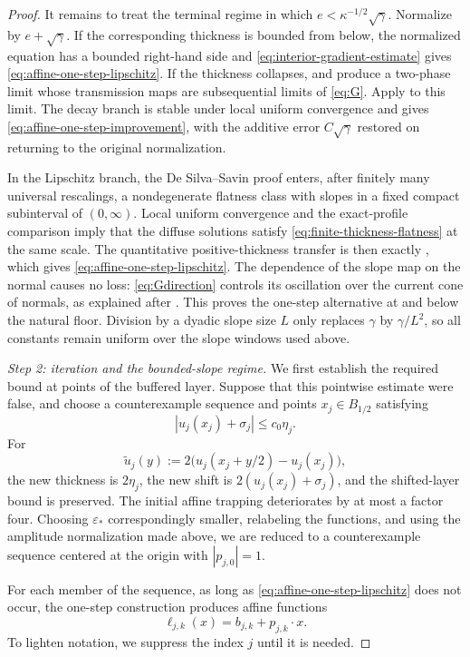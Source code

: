 \documentclass[11pt,letterpaper]{amsart}
\numberwithin{equation}{section}
\theoremstyle{definition}
\theoremstyle{remark}
\begin{document}
\begin{proof}
It remains to treat the terminal regime in which
$e<\kappa^{-1/2}\sqrt\gamma$. Normalize by $e+\sqrt\gamma$. If the
corresponding thickness is bounded from below, the normalized equation has
a bounded right-hand side and
\eqref{eq:interior-gradient-estimate} gives
\eqref{eq:affine-one-step-lipschitz}. If the thickness collapses,
 and  produce a
two-phase limit whose transmission maps are subsequential limits of
\eqref{eq:G}. Apply  to this limit.  The
decay branch is stable under local uniform convergence and gives
\eqref{eq:affine-one-step-improvement}, with the additive error
$C\sqrt\gamma$ restored on returning to the original normalization.

In the Lipschitz branch, the De Silva--Savin proof enters, after finitely
many universal rescalings, a nondegenerate flatness class with slopes in a
fixed compact subinterval of $(0,\infty)$.  Local uniform convergence and
the exact-profile comparison imply that the diffuse solutions satisfy
\eqref{eq:finite-thickness-flatness} at the same scale.  The quantitative
positive-thickness transfer is then exactly
, which gives
\eqref{eq:affine-one-step-lipschitz}.  The dependence of the slope map on
the normal causes no loss: \eqref{eq:Gdirection} controls its oscillation
over the current cone of normals, as explained after
.  This proves the one-step alternative at
and below the natural floor.  Division by a dyadic slope size $L$ only
replaces $\gamma$ by $\gamma/L^2$, so all constants remain uniform over the
slope windows used above.

\medskip
\noindent
\emph{Step 2: iteration and the bounded-slope regime.}
We first establish the required bound at points of the buffered layer.
Suppose that this pointwise estimate were false, and choose a counterexample
sequence and points $x_j\in B_{1/2}$ satisfying
$$
|u_j(x_j)+\sigma_j|\leq c_0\eta_j.
$$
For
$$
\widetilde u_j(y)
:=
2\bigl(u_j(x_j+y/2)-u_j(x_j)\bigr),
$$
the new thickness is $2\eta_j$, the new shift is
$2(u_j(x_j)+\sigma_j)$, and the shifted-layer bound is preserved.  The
initial affine trapping deteriorates by at most a factor four.  Choosing
$\varepsilon_*$ correspondingly smaller, relabeling the functions, and using
the amplitude normalization made above, we are reduced to a counterexample
sequence centered at the origin with $|p_{j,0}|=1$.

For each member of the sequence, as long as
\eqref{eq:affine-one-step-lipschitz} does not occur, the one-step construction
produces affine functions
$$
\ell_{j,k}(x)=b_{j,k}+p_{j,k}\cdot x.
$$
To lighten notation, we suppress the index $j$ until it is needed.


\end{proof}
\end{document}
